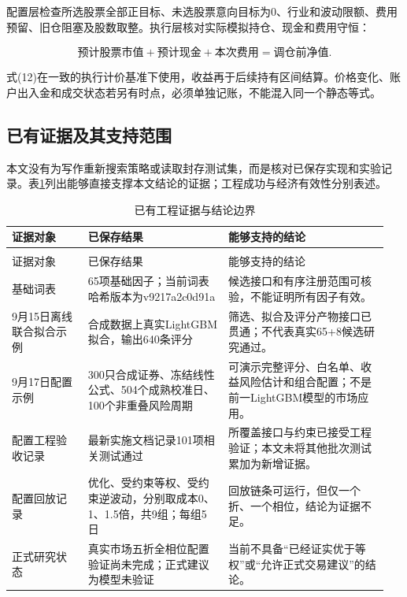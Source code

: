 \documentclass[UTF8,12pt,a4paper,fontset=none]{ctexart}
\begin{document}
配置层检查所选股票全部正目标、未选股票意向目标为0、行业和波动限额、费用预留、旧仓阻塞及股数取整。执行层核对实际模拟持仓、现金和费用守恒：


\begin{equation}
 \text{预计股票市值}+\text{预计现金}+\text{本次费用}=\text{调仓前净值}. \tag{12}
\end{equation}

式(12)在一致的执行计价基准下使用，收益再于后续持有区间结算。价格变化、账户出入金和成交状态若另有时点，必须单独记账，不能混入同一个静态等式。


\subsection{已有证据及其支持范围}

本文没有为写作重新搜索策略或读取封存测试集，而是核对已保存实现和实验记录。表\ref{tab:t4}列出能够直接支撑本文结论的证据；工程成功与经济有效性分别表述。


\begingroup\fontsize{9.6}{13.3}\selectfont\setlength{\tabcolsep}{2pt}\renewcommand{\arraystretch}{1.15}
\begin{longtable}{@{}>{\raggedright\arraybackslash}p{0.190\linewidth}>{\raggedright\arraybackslash}p{0.351\linewidth}>{\raggedright\arraybackslash}p{0.408\linewidth}@{}}
\caption{已有工程证据与结论边界}\label{tab:t4}\\
\toprule
证据对象 & 已保存结果 & 能够支持的结论 \\
\midrule
\endfirsthead

\multicolumn{3}{c}{表\thetable\ （续）}\\\toprule
证据对象 & 已保存结果 & 能够支持的结论 \\
\midrule
\endhead
\bottomrule
\endfoot

基础词表 & 65项基础因子；当前词表哈希版本为v9217a2c0d91a & 候选接口和有序注册范围可核验，不能证明所有因子有效。 \\

9月15日离线联合拟合示例 & 合成数据上真实LightGBM拟合，输出640条评分 & 筛选、拟合及评分产物接口已贯通；不代表真实65+8候选研究通过。 \\

9月17日配置示例 & 300只合成证券、冻结线性公式、504个成熟校准日、100个非重叠风险周期 & 可演示完整评分、白名单、收益风险估计和组合配置；不是前一LightGBM模型的市场应用。 \\

配置工程验收记录 & 最新实施文档记录101项相关测试通过 & 所覆盖接口与约束已接受工程验证；本文未将其他批次测试累加为新增证据。 \\

配置回放记录 & 优化、受约束等权、受约束逆波动，分别取成本0、1、1.5倍，共9组；每组5日 & 回放链条可运行，但仅一个折、一个相位，结论为证据不足。 \\

正式研究状态 & 真实市场五折全相位配置验证尚未完成；正式建议为模型未验证 & 当前不具备“已经证实优于等权”或“允许正式交易建议”的结论。 \\

\end{longtable}\endgroup
\end{document}
